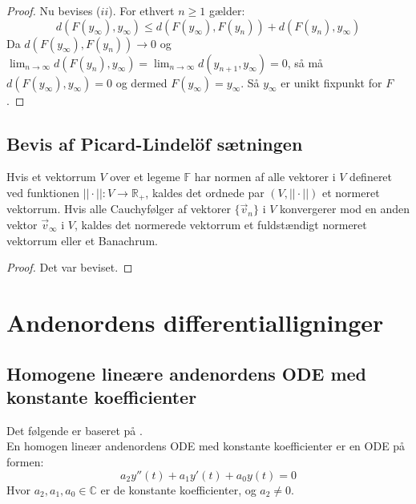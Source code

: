 \begin{proof}
Nu bevises ($ii$). For ethvert $n \geq 1$ gælder:
$$d(F(y_\infty),y_\infty)\leq d(F(y_\infty),F(y_n))+d(F(y_n),y_\infty)$$
Da $d(F(y_\infty),F(y_n))\rightarrow 0$ og $\lim_{n \to \infty} d(F(y_n),y_\infty) = \lim_{n \to \infty} d(y_{n+1},y_\infty)=0$, så må $d(F(y_\infty),y_\infty)=0$ og dermed $F(y_\infty)=y_\infty$. Så $y_\infty$ er unikt fixpunkt for $F$.
\end{proof}

\subsection{Bevis af Picard-Lindelöf sætningen}

\begin{definition}
Hvis et vektorrum $V$ over et legeme $\mathbb{F}$ har normen af alle vektorer i $V$ defineret ved funktionen $||\cdot||:V\to \mathbb{R}_+$, kaldes det ordnede par $(V,||\cdot||)$ et normeret vektorrum.
Hvis alle Cauchyfølger af vektorer $\{\vec{v}_n\}$ i $V$ konvergerer mod en anden vektor $\vec{v}_\infty$ i $V$, kaldes det normerede vektorrum et fuldstændigt normeret vektorrum eller et Banachrum.
\end{definition}

\begin{proof}
Det var beviset.
\end{proof}

\section{Andenordens differentialligninger}
\subsection{Homogene lineære andenordens ODE med konstante koefficienter}
Det følgende er baseret på \citep[s. 221]{JAB}. \\ \hfill \break En homogen lineær andenordens ODE med konstante koefficienter er en ODE på formen: \hfill \break
\begin{equation}
\label{homlinandord}
    a_2y''(t)+a_1y'(t)+a_0y(t)=0
\end{equation} \hfill \break
Hvor $a_2,a_1,a_0\in \mathbb{C}$ er de konstante koefficienter, og $a_2\neq 0$. \hfill \break


